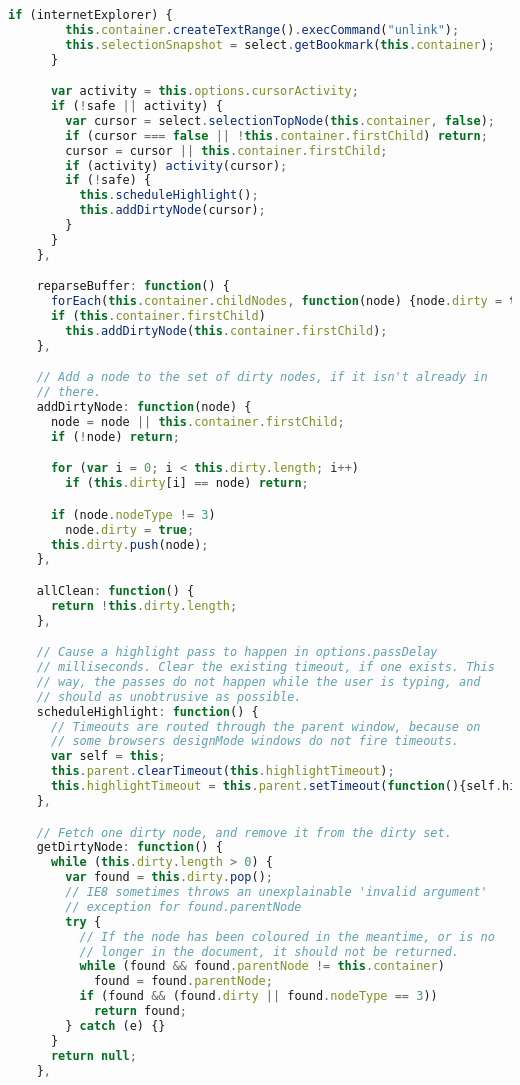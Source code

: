 \begin{lstlisting}[language=Javascript]
      if (internetExplorer) {
        this.container.createTextRange().execCommand("unlink");
        this.selectionSnapshot = select.getBookmark(this.container);
      }

      var activity = this.options.cursorActivity;
      if (!safe || activity) {
        var cursor = select.selectionTopNode(this.container, false);
        if (cursor === false || !this.container.firstChild) return;
        cursor = cursor || this.container.firstChild;
        if (activity) activity(cursor);
        if (!safe) {
          this.scheduleHighlight();
          this.addDirtyNode(cursor);
        }
      }
    },

    reparseBuffer: function() {
      forEach(this.container.childNodes, function(node) {node.dirty = true;});
      if (this.container.firstChild)
        this.addDirtyNode(this.container.firstChild);
    },

    // Add a node to the set of dirty nodes, if it isn't already in
    // there.
    addDirtyNode: function(node) {
      node = node || this.container.firstChild;
      if (!node) return;

      for (var i = 0; i < this.dirty.length; i++)
        if (this.dirty[i] == node) return;

      if (node.nodeType != 3)
        node.dirty = true;
      this.dirty.push(node);
    },

    allClean: function() {
      return !this.dirty.length;
    },

    // Cause a highlight pass to happen in options.passDelay
    // milliseconds. Clear the existing timeout, if one exists. This
    // way, the passes do not happen while the user is typing, and
    // should as unobtrusive as possible.
    scheduleHighlight: function() {
      // Timeouts are routed through the parent window, because on
      // some browsers designMode windows do not fire timeouts.
      var self = this;
      this.parent.clearTimeout(this.highlightTimeout);
      this.highlightTimeout = this.parent.setTimeout(function(){self.highlightDirty();}, this.options.passDelay);
    },

    // Fetch one dirty node, and remove it from the dirty set.
    getDirtyNode: function() {
      while (this.dirty.length > 0) {
        var found = this.dirty.pop();
        // IE8 sometimes throws an unexplainable 'invalid argument'
        // exception for found.parentNode
        try {
          // If the node has been coloured in the meantime, or is no
          // longer in the document, it should not be returned.
          while (found && found.parentNode != this.container)
            found = found.parentNode;
          if (found && (found.dirty || found.nodeType == 3))
            return found;
        } catch (e) {}
      }
      return null;
    },


\end{lstlisting}
